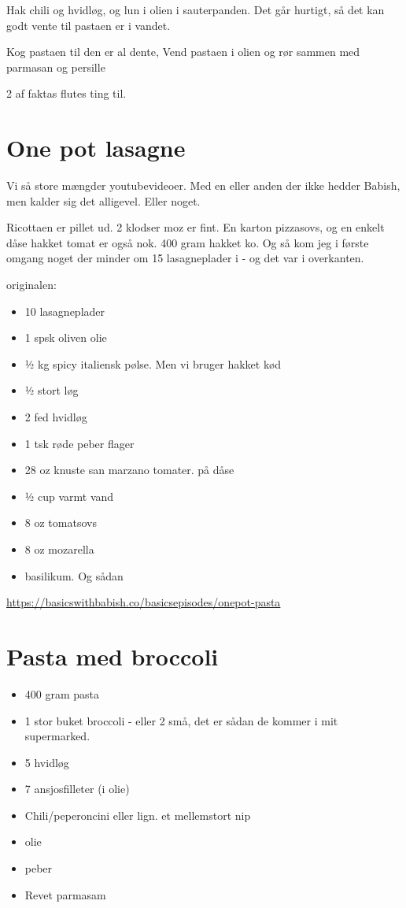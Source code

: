 \documentclass[
]{book}
\providecommand{\tightlist}{%
  \setlength{\itemsep}{0pt}\setlength{\parskip}{0pt}}
\begin{document}
Hak chili og hvidløg, og lun i olien i sauterpanden. Det går hurtigt, så det kan godt vente til pastaen er i vandet.

Kog pastaen til den er al dente,
Vend pastaen i olien og rør sammen med parmasan og persille

2 af faktas flutes ting til.

\section{One pot lasagne}\label{one-pot-lasagne}

Vi så store mængder youtubevideoer. Med en eller anden der ikke hedder Babish, men kalder sig det alligevel. Eller noget.

Ricottaen er pillet ud. 2 klodser moz er fint. En karton pizzasovs, og en enkelt dåse hakket tomat er også nok.
400 gram hakket ko.
Og så kom jeg i første omgang noget der minder om 15 lasagneplader i - og det var i overkanten.

originalen:

\begin{itemize}
\tightlist
\item
  10 lasagneplader
\item
  1 spsk oliven olie
\item
  ½ kg spicy italiensk pølse. Men vi bruger hakket kød
\item
  ½ stort løg
\item
  2 fed hvidløg
\item
  1 tsk røde peber flager
\item
  28 oz knuste san marzano tomater. på dåse
\item
  ½ cup varmt vand
\item
  8 oz tomatsovs
\item
  8 oz mozarella
\item
  basilikum. Og sådan
\end{itemize}

\url{https://basicswithbabish.co/basicsepisodes/onepot-pasta}

\section{Pasta med broccoli}\label{pasta-med-broccoli}

\begin{itemize}
\tightlist
\item
  400 gram pasta
\item
  1 stor buket broccoli - eller 2 små, det er sådan de kommer i mit supermarked.
\item
  5 hvidløg
\item
  7 ansjosfilleter (i olie)
\item
  Chili/peperoncini eller lign. et mellemstort nip
\item
  olie
\item
  peber
\item
  Revet parmasam
\end{itemize}
\end{document}
